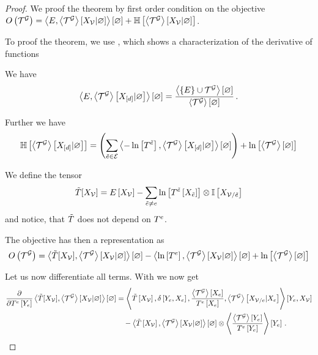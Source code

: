 \begin{proof}%
	We proof the theorem by first order condition on the objective $\objof{\extnet} = \sbcontraction{\energytensor,\extnetdist} + \sentropyof{\extnetdist}$.
	
	To proof the theorem, we use , which shows a characterization of the derivative of functions
	
	We have %
	\begin{align*}
		\sbcontraction{\energytensor,\normationof{\extnet}{\shortcatvariables}} 
		=  \frac{
			\contraction{\{\energytensor\}\cup\extnet} 
		}{
			\contraction{\extnet} 			
		} \, . 
	\end{align*}
	
	Further we have
	\begin{align*}
		\sentropyof{\normationof{\extnet}{\shortcatvariables}}
		= \left(\sum_{\secedge\in\edges} \contraction{-\lnof{\hypercoreof{\secedge}},\normationof{\extnet}{\shortcatvariables}} \right)
		+ \lnof{\contraction{\extnet}}	
	\end{align*}
	
	We define the tensor
		\[ \sechypercore[\catvariableof{\nodes}] = \energytensorat{\catvariableof{\nodes}} 
		- \sum_{\secedge\neq\edge} \lnof{\hypercoreofat{\secedge}{\catvariableof{\secedge}}} \otimes \onesat{\catvariableof{\nodes/\secedge}} \]
	and notice, that $\sechypercore$ does not depend on $\hypercoreof{\edge}$.	

	The objective has then a representation as
	\begin{align*}
		\objof{\extnet} = \sbcontraction{\sechypercore[\catvariableof{\nodes}], \extnetdist} - \sbcontraction{ \lnof{\hypercoreof{\edge}}, \extnetdist} +  \lnof{\contraction{\extnet}}
	\end{align*}
	
	Let us now differentiate all terms.
	With  we now get
	\begin{align*}
		\difwrt{\hypercoreofat{\edge}{\seccatvariableof{\edge}}} \sbcontraction{\sechypercore[\catvariableof{\nodes}], \extnetdist}
		& = \sbcontractionof{\sechypercoreat{\nodevariables},
	 	\identityat{\seccatvariableof{\edge},\edgevariables}, 
		\frac{\contractionof{\extnet}{\edgevariables}}{\hypercoreofat{\edge}{\edgevariables}}, 
		\normationofwrt{\extnet}{\catvariableof{\nodes/\edge}}{\edgevariables} }{\seccatvariableof{\edge},\nodevariables} \\
		& \quad -  \contraction{\sechypercoreat{\nodevariables},\extnetdist}
		 \otimes \sbcontractionof{\frac{\contractionof{\extnet}{\seccatvariableof{\edge}}}{\hypercoreofat{\edge}{\seccatvariableof{\edge}}}
		}{\seccatvariableof{\edge}} \, .
	\end{align*}
	

\end{proof}
